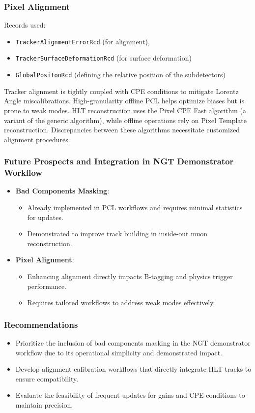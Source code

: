 \subsubsection{Pixel Alignment}
Records used: 
\begin{itemize}
\item \texttt{TrackerAlignmentErrorRcd} (for alignment), 
\item \texttt{TrackerSurfaceDeformationRcd} (for surface deformation)  \item \texttt{GlobalPositonRcd} (defining the relative position of the subdetectors) 
\end{itemize}

Tracker alignment is tightly coupled with CPE conditions to mitigate Lorentz Angle miscalibrations. High-granularity offline PCL helps optimize biases but is prone to weak modes.
HLT reconstruction uses the Pixel CPE Fast algorithm (a variant of the generic algorithm), while offline operations rely on Pixel Template reconstruction. Discrepancies between these algorithms necessitate customized alignment procedures.

\subsubsection*{Future Prospects and Integration in NGT Demonstrator Workflow}
\begin{itemize}
    \item \textbf{Bad Components Masking}:
    \begin{itemize}
        \item Already implemented in PCL workflows and requires minimal statistics for updates.
        \item Demonstrated to improve track building in inside-out muon reconstruction.
    \end{itemize}
    \item \textbf{Pixel Alignment}:
    \begin{itemize}
        \item Enhancing alignment directly impacts B-tagging and physics trigger performance.
        \item Requires tailored workflows to address weak modes effectively.
    \end{itemize}
\end{itemize}

\subsubsection*{Recommendations}
\begin{itemize}
    \item Prioritize the inclusion of bad components masking in the NGT demonstrator workflow due to its operational simplicity and demonstrated impact.
    \item Develop alignment calibration workflows that directly integrate HLT tracks to ensure compatibility.
    \item Evaluate the feasibility of frequent updates for gains and CPE conditions to maintain precision.
\end{itemize}